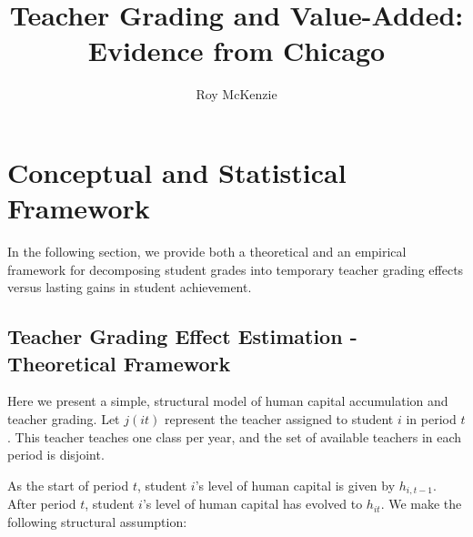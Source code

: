 \documentclass{article}
\title{Teacher Grading and Value-Added:
\\Evidence from Chicago}
\author{Roy McKenzie}
\begin{document}
\doublespacing
\section{Conceptual and Statistical Framework}
\label{section:framework}

In the following section, we provide both a theoretical and an empirical framework for decomposing student grades into temporary teacher grading effects versus lasting gains in student achievement. 

\subsection{Teacher Grading Effect Estimation - Theoretical Framework}

Here we present a simple, structural model of human capital accumulation and teacher grading. Let $j(it)$ represent the teacher assigned to student $i$ in period $t$. This teacher teaches one class per year, and the set of available teachers in each period is disjoint.

As the start of period $t$, student $i$'s level of human capital is given by $h_{i,t-1}$. After period $t$, student $i$'s level of human capital has evolved to $h_{it}$. We make the following structural assumption:

\bigskip 
\noindent{}\\

\end{document}
